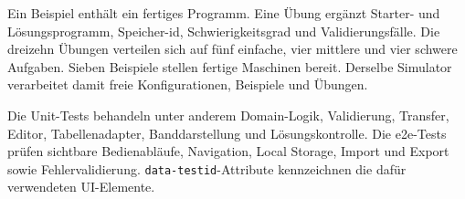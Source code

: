 
Ein Beispiel enthält ein fertiges Programm. Eine Übung ergänzt Starter- und Lösungsprogramm, Speicher-\gls{id}, Schwierigkeitsgrad und Validierungsfälle. Die dreizehn Übungen verteilen sich auf fünf einfache, vier mittlere und vier schwere Aufgaben. Sieben Beispiele stellen fertige Maschinen bereit. Derselbe Simulator verarbeitet damit freie Konfigurationen, Beispiele und Übungen.

Die Unit-Tests behandeln unter anderem Domain-Logik, Validierung, Transfer, Editor, Tabellenadapter, Banddarstellung und Lösungskontrolle. Die \gls{e2e}-Tests prüfen sichtbare Bedienabläufe, Navigation, Local Storage, Import und Export sowie Fehlervalidierung. \verb|data-testid|-Attribute kennzeichnen die dafür verwendeten UI-Elemente.
